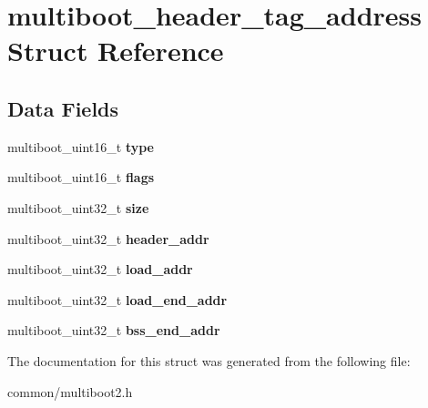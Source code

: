 \hypertarget{structmultiboot__header__tag__address}{}\section{multiboot\+\_\+header\+\_\+tag\+\_\+address Struct Reference}
\label{structmultiboot__header__tag__address}
\subsection*{Data Fields}
\begin{DoxyCompactItemize}
\item 
multiboot\+\_\+uint16\+\_\+t {\bfseries type}\hypertarget{structmultiboot__header__tag__address_a55b168cfeec194a071b66aea1b7b222a}{}\label{structmultiboot__header__tag__address_a55b168cfeec194a071b66aea1b7b222a}

\item 
multiboot\+\_\+uint16\+\_\+t {\bfseries flags}\hypertarget{structmultiboot__header__tag__address_a30d4bb80f516e8cc19f157917cfa8917}{}\label{structmultiboot__header__tag__address_a30d4bb80f516e8cc19f157917cfa8917}

\item 
multiboot\+\_\+uint32\+\_\+t {\bfseries size}\hypertarget{structmultiboot__header__tag__address_ae68d9688aa0594e6e1d1538e60106484}{}\label{structmultiboot__header__tag__address_ae68d9688aa0594e6e1d1538e60106484}

\item 
multiboot\+\_\+uint32\+\_\+t {\bfseries header\+\_\+addr}\hypertarget{structmultiboot__header__tag__address_ae8de19e0b2cb004cc82fd5e1aa54024e}{}\label{structmultiboot__header__tag__address_ae8de19e0b2cb004cc82fd5e1aa54024e}

\item 
multiboot\+\_\+uint32\+\_\+t {\bfseries load\+\_\+addr}\hypertarget{structmultiboot__header__tag__address_a54e4094be002e6572caa5d93b09ab74c}{}\label{structmultiboot__header__tag__address_a54e4094be002e6572caa5d93b09ab74c}

\item 
multiboot\+\_\+uint32\+\_\+t {\bfseries load\+\_\+end\+\_\+addr}\hypertarget{structmultiboot__header__tag__address_a43533259ca37170f4f40df16086baba5}{}\label{structmultiboot__header__tag__address_a43533259ca37170f4f40df16086baba5}

\item 
multiboot\+\_\+uint32\+\_\+t {\bfseries bss\+\_\+end\+\_\+addr}\hypertarget{structmultiboot__header__tag__address_ac3de23d94c391584665ba64757451a37}{}\label{structmultiboot__header__tag__address_ac3de23d94c391584665ba64757451a37}

\end{DoxyCompactItemize}


The documentation for this struct was generated from the following file\+:\begin{DoxyCompactItemize}
\item 
common/multiboot2.\+h\end{DoxyCompactItemize}
